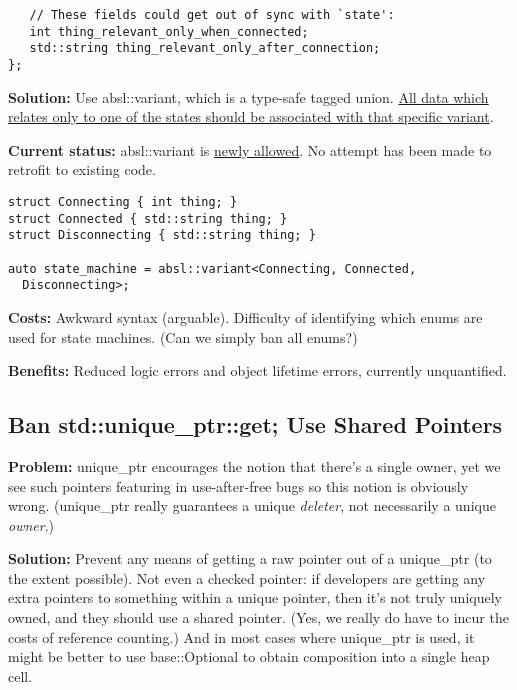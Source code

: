 \documentclass[a4paper,12pt,notitlepage,twoside,openright]{article}
\newcommand{\uline}[1]{#1}
\begin{document}
{\begin{verbatim}
   // These fields could get out of sync with `state':
   int thing_relevant_only_when_connected;
   std::string thing_relevant_only_after_connection;
};
\end{verbatim}

\textbf{Solution:} Use absl::variant, which is a type-safe tagged
union. \href{https://www.google.com/url?q=https://genbattle.bitbucket.io/blog/2016/10/07/Type-Safe-Unions-in-C-and-Rust/\&sa=D\&source=editors\&ust=1631944129075000\&usg=AOvVaw1q7XscklQWyKhOkY9vFTAF}{\uline{All
data which relates only to one of the states should be associated with
that specific variant}}.

\textbf{Current
status:} absl::variant is \href{https://www.google.com/url?q=https://groups.google.com/a/chromium.org/g/chromium-dev/c/sKVWxxSjVFU/m/MWqjjz9CAwAJ\&sa=D\&source=editors\&ust=1631944129076000\&usg=AOvVaw3UMonBEuD7BXE6zG71T5Lw}{\uline{newly
allowed}}. No attempt has been made to retrofit to existing code.

\begin{verbatim}
struct Connecting { int thing; }
struct Connected { std::string thing; }
struct Disconnecting { std::string thing; }

auto state_machine = absl::variant<Connecting, Connected,
  Disconnecting>;
\end{verbatim}

\textbf{Costs:} Awkward syntax (arguable). Difficulty of identifying
which enums are used for state machines. (Can we simply ban all enums?)

\textbf{Benefits:} Reduced logic errors and object lifetime errors,
currently unquantified.

\subsection{Ban std::unique\_ptr::get; Use Shared Pointers}

\textbf{Problem:} unique\_ptr encourages the notion that there's a
single owner, yet we see such pointers featuring in use-after-free bugs
so this notion is obviously wrong. (unique\_ptr really guarantees a
unique \emph{deleter}, not necessarily a unique \emph{owner}.)

\textbf{Solution:} Prevent any means of getting a raw pointer out of
a unique\_ptr (to the extent possible). Not even a checked pointer: if
developers are getting any extra pointers to something within a unique
pointer, then it's not truly uniquely owned, and they should use a
shared pointer. (Yes, we really do have to incur the costs of reference
counting.) And in most cases where unique\_ptr is used, it might be
better to use base::Optional to obtain composition into a single heap
cell.

}
\end{document}

